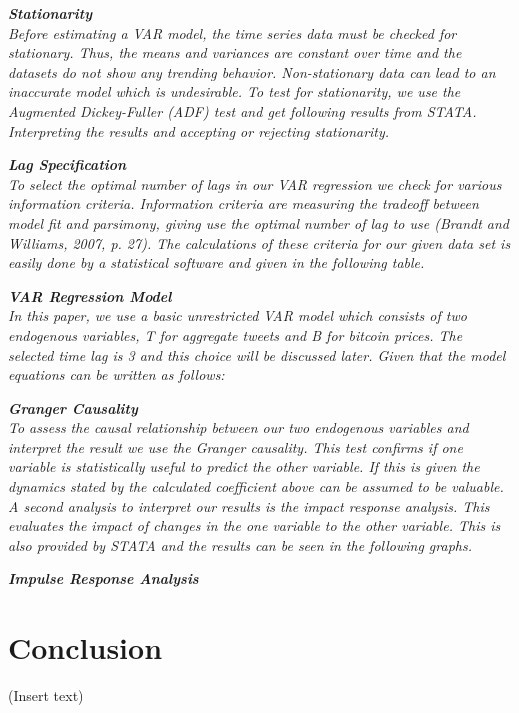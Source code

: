 \documentclass[a4paper,american,12pt]{article}
\begin{document}
\begin{spacing}{1.2}
		\itshape\textbf {Stationarity}\\
		\textnormal {Before estimating a VAR model, the time series data must be checked for stationary. Thus, the means and variances are constant over time and the datasets do not show any trending behavior. Non-stationary data can lead to an inaccurate model which is undesirable. To test for stationarity, we use the Augmented Dickey-Fuller (ADF) test and get following results from STATA.\\
Interpreting the results and accepting or rejecting stationarity.}

		\itshape\textbf {Lag Specification}\\
		\textnormal {To select the optimal number of lags in our VAR regression we check for various information criteria. Information criteria are measuring the tradeoff between model fit and parsimony, giving use the optimal number of lag to use (Brandt and Williams, 2007, p. 27). The calculations of these criteria for our given data set is easily done by a statistical software and given in the following table.\\}
		
		\itshape\textbf {VAR Regression Model}\\
		\textnormal {In this paper, we use a basic unrestricted VAR model which consists of two endogenous variables, T for aggregate tweets and B for bitcoin prices. The selected time lag is 3 and this choice will be discussed later. Given that the model equations can be written as follows:\\}
		
		\itshape\textbf {Granger Causality}\\
		\textnormal {To assess the causal relationship between our two endogenous variables and interpret the result we use the Granger causality. This test confirms if one variable is statistically useful to predict the other variable. If this is given the dynamics stated by the calculated coefficient above can be assumed to be valuable.\\
A second analysis to interpret our results is the impact response analysis. This evaluates the impact of changes in the one variable to the other variable. This is also provided by STATA and the results can be seen in the following graphs.}

		\itshape\textbf {Impulse Response Analysis}\\
					
		\clearpage
		
		\section{Conclusion}
		\textnormal {(Insert text)}
		
		\clearpage
		
	\end{spacing}

\clearpage

\printbibliography
\clearpage

\end{document}
